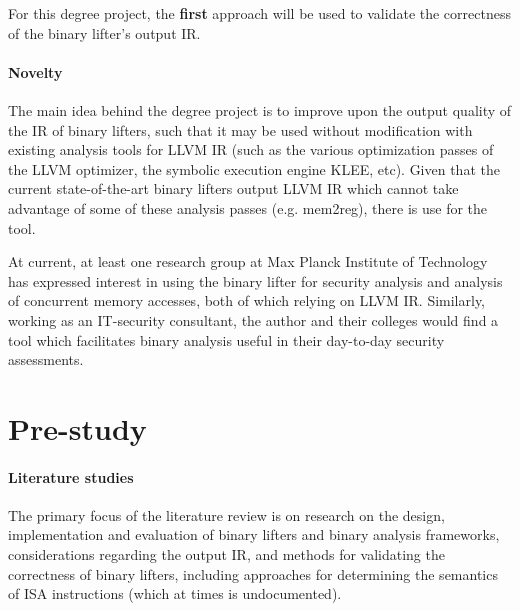 \documentclass[12pt, a4paper]{article}
\begin{document}
For this degree project, the \textbf{first} approach will be used to validate the correctness of the binary lifter's output IR.


\paragraph{Novelty}

The main idea behind the degree project is to improve upon the output quality of the IR of binary lifters, such that it may be used without modification with existing analysis tools for LLVM IR (such as the various optimization passes of the LLVM optimizer, the symbolic execution engine KLEE, etc). Given that the current state-of-the-art binary lifters output LLVM IR which cannot take advantage of some of these analysis passes (e.g. mem2reg), there is use for the tool.

At current, at least one research group at Max Planck Institute of Technology has expressed interest in using the binary lifter for security analysis and analysis of concurrent memory accesses, both of which relying on LLVM IR. Similarly, working as an IT-security consultant, the author and their colleges would find a tool which facilitates binary analysis useful in their day-to-day security assessments.


\section{Pre-study}


\paragraph{Literature studies}

The primary focus of the literature review is on research on the design, implementation and evaluation of binary lifters and binary analysis frameworks, considerations regarding the output IR, and methods for validating the correctness of binary lifters, including approaches for determining the semantics of ISA instructions (which at times is undocumented).
\end{document}
